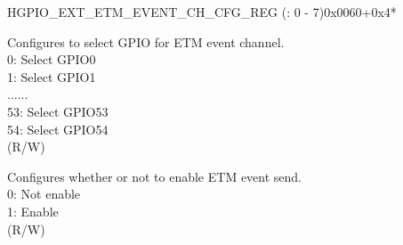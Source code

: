 \begin{register}{H}{GPIO\_EXT\_ETM\_EVENT\_CH\_CFG\_REG (: 0 - 7)}{0x0060+0x4*}\label{regdesc:GPIOSDETMEVENTCHNCFGREG}
%
%
%
%
\regnewline%
\begin{regdesc}\begin{reglist}
\label{fielddesc:GPIOSDETMCH0EVENTSEL}\item [GPIO\_EXT\_ETM\_CH\regindex{n}\_EVENT\_SEL] Configures to select GPIO for ETM event channel.\\
0: Select GPIO0\\
1: Select GPIO1\\
......\\
53: Select GPIO53\\
54: Select GPIO54\\ (R/W)
\label{fielddesc:GPIOSDETMCH0EVENTEN}\item [GPIO\_EXT\_ETM\_CH\regindex{n}\_EVENT\_EN]  Configures whether or not to enable ETM event send.\\
0: Not enable\\
1: Enable\\(R/W)
\end{reglist}\end{regdesc}
\end{register}


